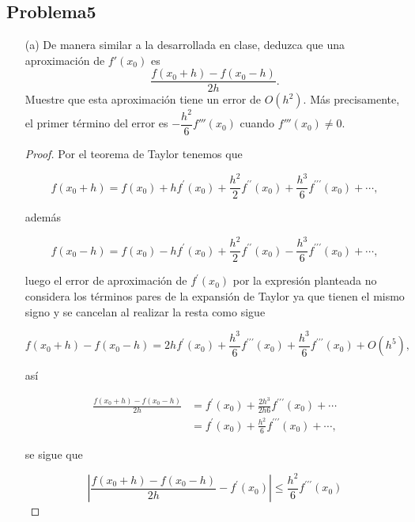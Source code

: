 \documentclass[12pt, a4paper]{article}%
\begin{document}
\subsection*{Problema5}
\begin{itemize}
    \item[(a)] De manera similar a la desarrollada en clase, deduzca que una aproximación de \( f'(x_0) \) es
    \[
    \dfrac{f(x_0 + h) - f(x_0 - h)}{2h}.
    \]
    Muestre que esta aproximación tiene un error de \( O(h^2) \). Más precisamente, el primer término del error es \( -\dfrac{h^2}{6} f'''(x_0) \) cuando \( f'''(x_0) \neq 0 \).

\begin{proof}
Por el teorema de Taylor tenemos que

$$
f\left(x_0+h\right)=f\left(x_0\right)+h f^{\prime}\left(x_0\right)+\frac{h^2}{2}  f^{\prime \prime}\left(x_0\right)+\frac{h^3}{6} f^{\prime \prime \prime}\left(x_0\right)+\cdots,
$$

además
    
$$
f\left(x_0-h\right)=f\left(x_0\right)-h f^{\prime}\left(x_0\right)+\frac{h^2}{2}  f^{\prime \prime}\left(x_0\right)-\frac{h^3}{6} f^{\prime \prime \prime}\left(x_0\right)+\cdots,
$$

luego el error de aproximación de $f^{\prime}\left(x_0\right)$ por la expresión planteada no considera los términos pares de la expansión de Taylor ya que tienen el mismo signo y se cancelan al realizar la resta como sigue

$$
f\left(x_0+h\right)-f\left(x_0-h\right)=2 h f^{\prime}\left(x_0\right)+\frac{h^3}{6} f^{\prime \prime \prime}\left(x_0\right)+\frac{h^3}{6} f^{\prime \prime \prime}\left(x_0\right)+O(h^5),
$$

así

$$
\begin{aligned}
\frac{f\left(x_0+h\right)-f\left(x_0-h\right)}{2 h} & =f^{\prime}\left(x_0\right)+\frac{ 2h^3}{2h6} f^{\prime \prime \prime}\left(x_0\right)+\cdots \\
& =f^{\prime}\left(x_0\right)+\frac{h^2}{6} f^{\prime \prime \prime}\left(x_0\right)+\cdots,
\end{aligned}
$$

se sigue que


$$\left|\frac{f\left(x_0+h\right)-f\left(x_0-h\right)}{2 h}-f^{\prime}(x_0)\right|\leq \frac{h^2}{6} f^{\prime \prime \prime}\left(x_0\right)$$

\end{proof}
    

\end{itemize}
\end{document}
